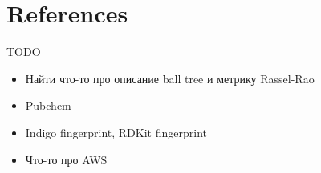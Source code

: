 \section{References}

{\color{red} TODO}

\begin{itemize}
  \item {\color{red} Найти что-то про описание ball tree и метрику Rassel-Rao}
  \item {\color{red} Pubchem}
  \item {\color{red} Indigo fingerprint, RDKit fingerprint}
  \item {\color{red} Что-то про AWS}

\end{itemize}
